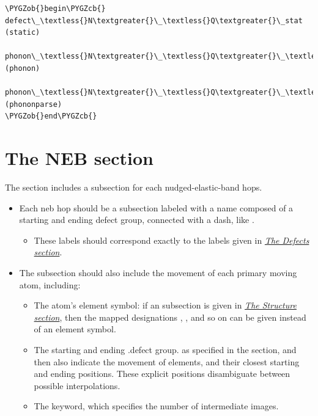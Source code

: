 \documentclass[letterpaper,10pt,english]{sphinxmanual}
\def\PYGZob{\char`\{}
\def\PYGZcb{\char`\}}
\begin{document}
\begin{Verbatim}[commandchars=\\\{\}]
\PYGZob{}begin\PYGZcb{}
defect\_\textless{}N\textgreater{}\_\textless{}Q\textgreater{}\_stat (static)
    phonon\_\textless{}N\textgreater{}\_\textless{}Q\textgreater{}\_\textless{}P\textgreater{} (phonon)
        phonon\_\textless{}N\textgreater{}\_\textless{}Q\textgreater{}\_\textless{}P\textgreater{}\_parse (phononparse)
\PYGZob{}end\PYGZcb{}
\end{Verbatim}


\section{The NEB section}
\label{3_1_6_neb:the-neb-section}\label{3_1_6_neb::doc}
The  section includes a subsection for each nudged-elastic-band hops.
\begin{itemize}
\item {} 
Each neb hop should be a subsection labeled with a name composed of a starting and ending defect group, connected with a dash, like .
\begin{itemize}
\item {} 
These labels should correspond exactly to the labels given in {\hyperref[3_1_5_defects::doc]{\emph{The Defects section}}}.

\end{itemize}

\item {} 
The subsection should also include the movement of each primary moving atom, including:
\begin{itemize}
\item {} 
The atom's element symbol: if an  subsection is given in {\hyperref[3_1_1_structure::doc]{\emph{The Structure section}}}, then the mapped designations , , and so on can be given instead of an element symbol.

\item {} 
The starting and ending .defect group. as specified in the  section, and then also indicate the movement of elements, and their closest starting and ending positions. These explicit positions disambiguate between possible interpolations.

\item {} 
The  keyword, which specifies the number of intermediate images.

\end{itemize}

\end{itemize}
\end{document}
